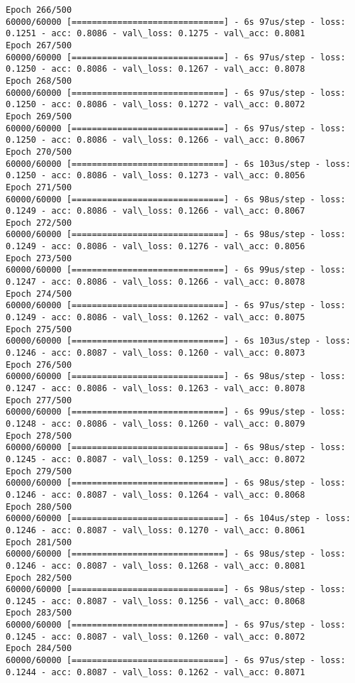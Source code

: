 \documentclass[11pt]{article}
\begin{document}
\begin{Verbatim}[commandchars=\\\{\}]
Epoch 266/500
60000/60000 [==============================] - 6s 97us/step - loss: 0.1251 - acc: 0.8086 - val\_loss: 0.1275 - val\_acc: 0.8081
Epoch 267/500
60000/60000 [==============================] - 6s 97us/step - loss: 0.1250 - acc: 0.8086 - val\_loss: 0.1267 - val\_acc: 0.8078
Epoch 268/500
60000/60000 [==============================] - 6s 97us/step - loss: 0.1250 - acc: 0.8086 - val\_loss: 0.1272 - val\_acc: 0.8072
Epoch 269/500
60000/60000 [==============================] - 6s 97us/step - loss: 0.1250 - acc: 0.8086 - val\_loss: 0.1266 - val\_acc: 0.8067
Epoch 270/500
60000/60000 [==============================] - 6s 103us/step - loss: 0.1250 - acc: 0.8086 - val\_loss: 0.1273 - val\_acc: 0.8056
Epoch 271/500
60000/60000 [==============================] - 6s 98us/step - loss: 0.1249 - acc: 0.8086 - val\_loss: 0.1266 - val\_acc: 0.8067
Epoch 272/500
60000/60000 [==============================] - 6s 98us/step - loss: 0.1249 - acc: 0.8086 - val\_loss: 0.1276 - val\_acc: 0.8056
Epoch 273/500
60000/60000 [==============================] - 6s 99us/step - loss: 0.1247 - acc: 0.8086 - val\_loss: 0.1266 - val\_acc: 0.8078
Epoch 274/500
60000/60000 [==============================] - 6s 97us/step - loss: 0.1249 - acc: 0.8086 - val\_loss: 0.1262 - val\_acc: 0.8075
Epoch 275/500
60000/60000 [==============================] - 6s 103us/step - loss: 0.1246 - acc: 0.8087 - val\_loss: 0.1260 - val\_acc: 0.8073
Epoch 276/500
60000/60000 [==============================] - 6s 98us/step - loss: 0.1247 - acc: 0.8086 - val\_loss: 0.1263 - val\_acc: 0.8078
Epoch 277/500
60000/60000 [==============================] - 6s 99us/step - loss: 0.1248 - acc: 0.8086 - val\_loss: 0.1260 - val\_acc: 0.8079
Epoch 278/500
60000/60000 [==============================] - 6s 98us/step - loss: 0.1245 - acc: 0.8087 - val\_loss: 0.1259 - val\_acc: 0.8072
Epoch 279/500
60000/60000 [==============================] - 6s 98us/step - loss: 0.1246 - acc: 0.8087 - val\_loss: 0.1264 - val\_acc: 0.8068
Epoch 280/500
60000/60000 [==============================] - 6s 104us/step - loss: 0.1246 - acc: 0.8087 - val\_loss: 0.1270 - val\_acc: 0.8061
Epoch 281/500
60000/60000 [==============================] - 6s 98us/step - loss: 0.1246 - acc: 0.8087 - val\_loss: 0.1268 - val\_acc: 0.8081
Epoch 282/500
60000/60000 [==============================] - 6s 98us/step - loss: 0.1245 - acc: 0.8087 - val\_loss: 0.1256 - val\_acc: 0.8068
Epoch 283/500
60000/60000 [==============================] - 6s 97us/step - loss: 0.1245 - acc: 0.8087 - val\_loss: 0.1260 - val\_acc: 0.8072
Epoch 284/500
60000/60000 [==============================] - 6s 97us/step - loss: 0.1244 - acc: 0.8087 - val\_loss: 0.1262 - val\_acc: 0.8071

\end{Verbatim}
\end{document}
